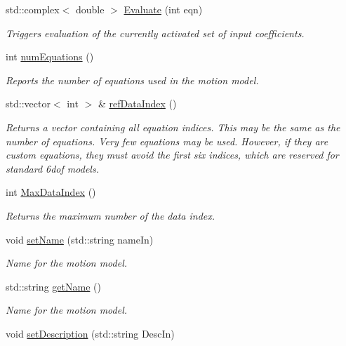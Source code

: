 \begin{DoxyCompactItemize}
std\-::complex$<$ double $>$ \hyperlink{classosea_1_1ofreq_1_1_motion_model_a331d96a45df8ca0911fc4610705c3a30}{Evaluate} (int eqn)
\begin{DoxyCompactList}\small\item\em Triggers evaluation of the currently activated set of input coefficients. \end{DoxyCompactList}\item 
int \hyperlink{classosea_1_1ofreq_1_1_motion_model_a0a228c24a524e2a1c6636d3121a842be}{num\-Equations} ()
\begin{DoxyCompactList}\small\item\em Reports the number of equations used in the motion model. \end{DoxyCompactList}\item 
std\-::vector$<$ int $>$ \& \hyperlink{classosea_1_1ofreq_1_1_motion_model_ac62401cfe337e9404867819c529f2300}{ref\-Data\-Index} ()
\begin{DoxyCompactList}\small\item\em Returns a vector containing all equation indices. This may be the same as the number of equations. Very few equations may be used. However, if they are custom equations, they must avoid the first six indices, which are reserved for standard 6dof models. \end{DoxyCompactList}\item 
int \hyperlink{classosea_1_1ofreq_1_1_motion_model_a81ed21162a09ffce06043f3a7fb4213d}{Max\-Data\-Index} ()
\begin{DoxyCompactList}\small\item\em Returns the maximum number of the data index. \end{DoxyCompactList}\item 
void \hyperlink{classosea_1_1ofreq_1_1_motion_model_a42d989727028c18c59ba04f958bc7b74}{set\-Name} (std\-::string name\-In)
\begin{DoxyCompactList}\small\item\em Name for the motion model. \end{DoxyCompactList}\item 
std\-::string \hyperlink{classosea_1_1ofreq_1_1_motion_model_af9fd1e58735b7f47bc5d5257bdca9139}{get\-Name} ()
\begin{DoxyCompactList}\small\item\em Name for the motion model. \end{DoxyCompactList}\item 
void \hyperlink{classosea_1_1ofreq_1_1_motion_model_a5097540bb98ad753594d41890e6ef30d}{set\-Description} (std\-::string Desc\-In)

\end{DoxyCompactItemize}
